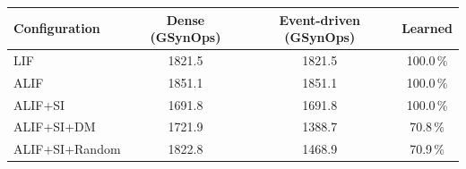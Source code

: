 \begin{tabular}{@{}lccc@{}}
\toprule
\textbf{Configuration} & \textbf{Dense (GSynOps)} & \textbf{Event-driven (GSynOps)} & \textbf{Learned} \\
\midrule
LIF & 1821.5 & 1821.5 & 100.0\,\% \\
ALIF & 1851.1 & 1851.1 & 100.0\,\% \\
ALIF+SI & 1691.8 & 1691.8 & 100.0\,\% \\
ALIF+SI+DM & 1721.9 & 1388.7 & 70.8\,\% \\
ALIF+SI+Random & 1822.8 & 1468.9 & 70.9\,\% \\
\bottomrule
\end{tabular}
